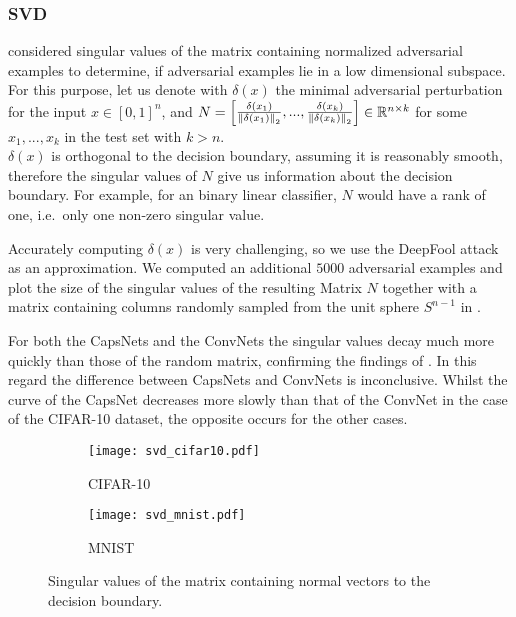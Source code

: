 \subsubsection{SVD}
\citet{universal} considered singular values of the matrix containing normalized adversarial examples to determine, if adversarial examples lie in a low dimensional subspace. \\
For this purpose, let us denote with $\delta(x)$ the minimal adversarial perturbation for the input $x \in [0,1]^n$,
and $ N = \begin{bmatrix}
\frac{\delta(x_1)} {\left \lVert \delta(x_1) \right \rVert _{2}},  ...,  \frac{\delta(x_k)} {\left \lVert \delta(x_k) \right \rVert _{2}} 
\end{bmatrix}
\in \mathbb{R}^{n \times k}
$ for some $x_1, ..., x_k$ in the test set with $k > n$. \\
$\delta(x)$ is orthogonal to the decision boundary, assuming it is reasonably smooth, therefore the singular values of $N$ give us information about the decision boundary. For example, for an binary linear classifier, $N$ would have a rank of one, i.e.\ only one non-zero singular value.

Accurately computing $\delta(x)$ is very challenging, so we use the DeepFool attack as an approximation.
We computed an additional $5000$ adversarial examples and plot the size of the singular values of the resulting Matrix $N$ together with a matrix containing columns randomly sampled from the unit sphere $S^{n-1}$ in .

For both the CapsNets and the ConvNets the singular values decay much more quickly than those of the random matrix, confirming the findings of \citet{universal}.
In this regard the difference between CapsNets and ConvNets is inconclusive.
Whilst the curve of the CapsNet decreases more slowly than that of the ConvNet in the case of the CIFAR-10 dataset, the opposite occurs for the other cases. 


\begin{figure}
	\centering
	\begin{subfigure}{.5\textwidth}
		\texttt{[image: svd\_cifar10.pdf]}
		\caption{CIFAR-10}
	\end{subfigure}%
	\begin{subfigure}{.5\textwidth}
		\texttt{[image: svd\_mnist.pdf]}
		\caption{MNIST}
	\end{subfigure}
	
	\caption{Singular values of the matrix containing normal vectors to the decision boundary.}
	\label{fig:svd}
\end{figure}

